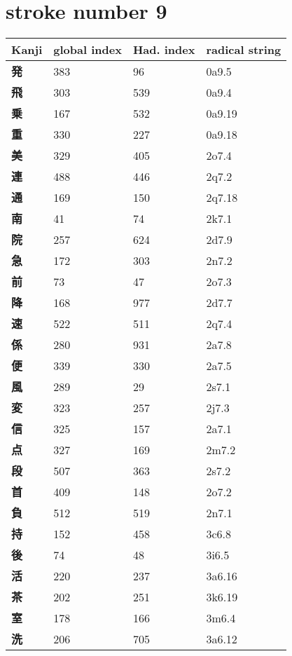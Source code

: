 \section{stroke number 9}
  \begin{longtable}[c]{llll}
    \bfseries Kanji & \bfseries global index & \bfseries Had. index & \bfseries radical string\\\hline\endhead
    \bfseries 発 & 383 & 96 & 0a9.5\\
    \bfseries 飛 & 303 & 539 & 0a9.4\\
    \bfseries 乗 & 167 & 532 & 0a9.19\\
    \bfseries 重 & 330 & 227 & 0a9.18\\
    \bfseries 美 & 329 & 405 & 2o7.4\\
    \bfseries 連 & 488 & 446 & 2q7.2\\
    \bfseries 通 & 169 & 150 & 2q7.18\\
    \bfseries 南 & 41 & 74 & 2k7.1\\
    \bfseries 院 & 257 & 624 & 2d7.9\\
    \bfseries 急 & 172 & 303 & 2n7.2\\
    \bfseries 前 & 73 & 47 & 2o7.3\\
    \bfseries 降 & 168 & 977 & 2d7.7\\
    \bfseries 速 & 522 & 511 & 2q7.4\\
    \bfseries 係 & 280 & 931 & 2a7.8\\
    \bfseries 便 & 339 & 330 & 2a7.5\\
    \bfseries 風 & 289 & 29 & 2s7.1\\
    \bfseries 変 & 323 & 257 & 2j7.3\\
    \bfseries 信 & 325 & 157 & 2a7.1\\
    \bfseries 点 & 327 & 169 & 2m7.2\\
    \bfseries 段 & 507 & 363 & 2s7.2\\
    \bfseries 首 & 409 & 148 & 2o7.2\\
    \bfseries 負 & 512 & 519 & 2n7.1\\
    \bfseries 持 & 152 & 458 & 3c6.8\\
    \bfseries 後 & 74 & 48 & 3i6.5\\
    \bfseries 活 & 220 & 237 & 3a6.16\\
    \bfseries 茶 & 202 & 251 & 3k6.19\\
    \bfseries 室 & 178 & 166 & 3m6.4\\
    \bfseries 洗 & 206 & 705 & 3a6.12\\

\end{longtable}
